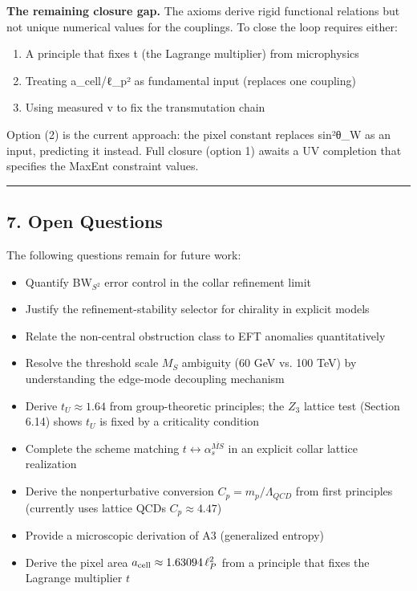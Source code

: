 \textbf{The remaining closure gap.} The axioms derive rigid functional relations but not unique numerical values for the couplings. To close the loop requires either:

\begin{enumerate}
\def\labelenumi{\arabic{enumi}.}
\tightlist
\item
  A principle that fixes t (the Lagrange multiplier) from microphysics
\item
  Treating a\_cell/ℓ\_p² as fundamental input (replaces one coupling)
\item
  Using measured v to fix the transmutation chain
\end{enumerate}

Option (2) is the current approach: the pixel constant replaces sin²θ\_W as an input, predicting it instead. Full closure (option 1) awaits a UV completion that specifies the MaxEnt constraint values.

\begin{center}\rule{0.5\linewidth}{0.5pt}\end{center}

\subsection{7. Open Questions}\label{7-open-questions}

The following questions remain for future work:

\begin{itemize}
\tightlist
\item
  Quantify BW\(_{S^2}\) error control in the collar refinement limit
\item
  Justify the refinement-stability selector for chirality in explicit models
\item
  Relate the non-central obstruction class to EFT anomalies quantitatively
\item
  Resolve the threshold scale \(M_S\) ambiguity (60 GeV vs. 100 TeV) by understanding the edge-mode decoupling mechanism
\item
  Derive \(t_U \approx 1.64\) from group-theoretic principles; the \(Z_3\) lattice test (Section 6.14) shows \(t_U\) is fixed by a criticality condition
\item
  Complete the scheme matching \(t \leftrightarrow \alpha_s^{\overline{MS}}\) in an explicit collar lattice realization
\item
  Derive the nonperturbative conversion \(C_p = m_p/\Lambda_{QCD}\) from first principles (currently uses lattice QCD\textquotesingle s \(C_p \approx 4.47\))
\item
  Provide a microscopic derivation of A3 (generalized entropy)
\item
  Derive the pixel area \(a_{\rm cell} \approx 1.63094\,\ell_P^2\) from a principle that fixes the Lagrange multiplier \(t\)
\end{itemize}

